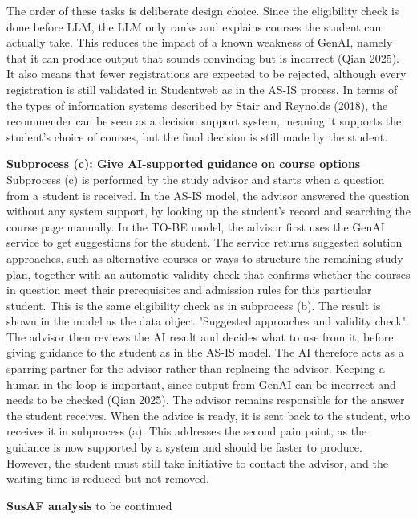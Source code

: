 The order of these tasks is deliberate design choice. Since the eligibility check is done before LLM, the LLM only ranks and explains courses the student can actually take. This reduces the impact of a known weakness of GenAI, namely that it can produce output that sounds convincing but is incorrect (Qian 2025). It also means that fewer registrations are expected to be rejected, although every registration is still validated in Studentweb as in the AS-IS process. In terms of the types of information systems described by Stair and Reynolds (2018), the recommender can be seen as a decision support system, meaning it supports the student's choice of courses, but the final decision is still made by the student. 

\textbf{Subprocess (c): Give AI-supported guidance on course options}
Subprocess (c) is performed by the study advisor and starts when a question from a student is received. In the AS-IS model, the advisor answered the question without  any system support, by looking up the student's record and searching the course page manually. In the TO-BE model, the advisor first uses the GenAI service to get suggestions for the student. The service returns suggested solution approaches, such as alternative courses or ways to structure the remaining study plan, together with an automatic validity check that confirms whether the courses in question meet their prerequisites and admission rules for this particular student. This is the same eligibility check as in subprocess (b). The result is shown in the model as the data object "Suggested approaches and validity check". The advisor then reviews the AI result and decides what to use from it, before giving guidance to the student as in the AS-IS model. The AI therefore acts as a sparring partner for the advisor rather than replacing the advisor. Keeping a human in the loop is important, since output from GenAI can be incorrect and needs to be checked (Qian 2025). The advisor remains responsible for the answer the student receives. When the advice is ready, it is sent back to the student, who receives it in subprocess (a). This addresses the second pain point, as the guidance is now supported by a system and should be faster to produce. However, the student must still take initiative to contact the advisor, and the waiting time is reduced but not removed. 

\textbf{SusAF analysis}
to be continued



